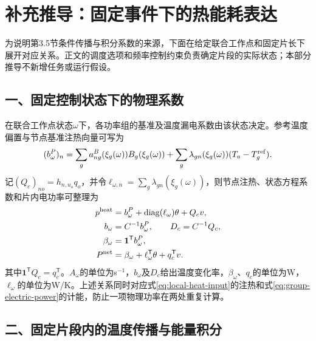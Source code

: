 \clearpage
\section*{补充推导：固定事件下的热能耗表达}
\label{sec:formal-details}

为说明第3.5节条件传播与积分系数的来源，下面在给定联合工作点和固定片长下展开对应关系。正文的调度选项和频率控制约束负责确定片段的实际状态；本部分推导不新增任务或运行假设。

\subsection*{一、固定控制状态下的物理系数}

在联合工作点状态$\omega$下，各功率组的基准及温度漏电系数由该状态决定。参考温度偏置与节点基准注热向量可写为
\begin{equation}
(b^P_\omega)_n=
\sum_g a^B_{ng}(\xi_g(\omega))B_g(\xi_g(\omega))
+\sum_g\lambda_{gn}(\xi_g(\omega))(T_a-T_g^{\rm ref}).
\label{eq:baseline-vector}
\end{equation}
记$(Q_c)_{no}=h_{n,u_o}q_o$，并令$\ell_{\omega,n}=\sum_g\lambda_{gn}(\xi_g(\omega))$，则节点注热、状态方程系数和片内电功率可整理为
\begin{equation}
\begin{aligned}
p^{\rm heat}&=b^P_\omega+\operatorname{diag}(\ell_\omega)\theta+Q_cv,\\
b_\omega&=C^{-1}b^P_\omega,\qquad D_c=C^{-1}Q_c,\\
\beta_\omega&=\mathbf1^{\mathsf T}b^P_\omega,\\
P^{\rm net}&=\beta_\omega+\ell_\omega^{\mathsf T}\theta+q_c^{\mathsf T}v.
\end{aligned}
\label{eq:physical-coefficients}
\end{equation}
其中$\mathbf1^{\mathsf T}Q_c=q_c^{\mathsf T}$。$A_\omega$的单位为s$^{-1}$，$b_\omega$及$D_c$给出温度变化率，$\beta_\omega$、$q_c$的单位为W，$\ell_\omega$的单位为W/K。上述关系同时对应式\eqref{eq:local-heat-input}的注热和式\eqref{eq:group-electric-power}的计能，防止一项物理功率在两处重复计算。

\subsection*{二、固定片段内的温度传播与能量积分}

